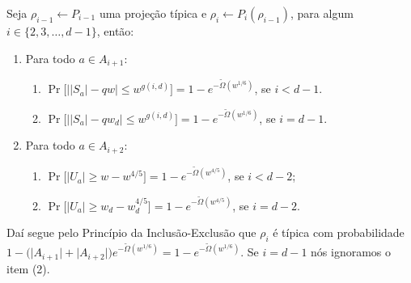 \begin{prop} \label{typical_whp_Pi}

Seja $\rho_{i - 1} \leftarrow P_{i - 1}$ uma projeção típica e $\rho_{i} \leftarrow P_{i}(\rho_{i - 1})$, para algum $i \in \{2, 3, \dots, d- 1\}$, então:

\begin{enumerate}

	\item Para todo $a \in A_{i + 1}$:
	
	\begin{enumerate}
	
		\item $\Pr \Big[\big\lvert \lvert S_{a} \rvert - qw \big\rvert \leq w^{g(i, d)} \Big] = 1 - e^{-\widetilde{\Omega}(w^{1/6})}$, se $i < d - 1$.
		
		\item $\Pr \Big[\big\lvert \lvert S_{a} \rvert - qw_{d} \big\rvert \leq w^{g(i, d)} \Big] = 1 - e^{-\widetilde{\Omega}(w^{1/6})}$, se $i = d - 1$.
	
	\end{enumerate}
	
	\item Para todo $a \in A_{i + 2}$:
	
	\begin{enumerate}
	
		\item $\Pr \big[ \lvert U_{a} \rvert \geq w - w^{4/5} \big] = 1 - e^{-\widetilde{\Omega}(w^{4/5})}$, se $i < d - 2$;
		
		\item $\Pr \big[ \lvert U_{a} \rvert \geq w_{d} - w_{d}^{4/5} \big] = 1 - e^{-\widetilde{\Omega}(w^{4/5})}$, se $i = d - 2$.
	
	\end{enumerate}

\end{enumerate}

Daí segue pelo Princípio da Inclusão-Exclusão que $\rho_{i}$ é típica com probabilidade $1 - \big( \lvert A_{i + 1} \rvert + \lvert A_{i + 2} \rvert \big)e^{-\widetilde{\Omega}(w^{1/6})} = 1 - e^{-\widetilde{\Omega}(w^{1/6})}$. Se $i = d - 1$ nós ignoramos o item (2).

\end{prop}

